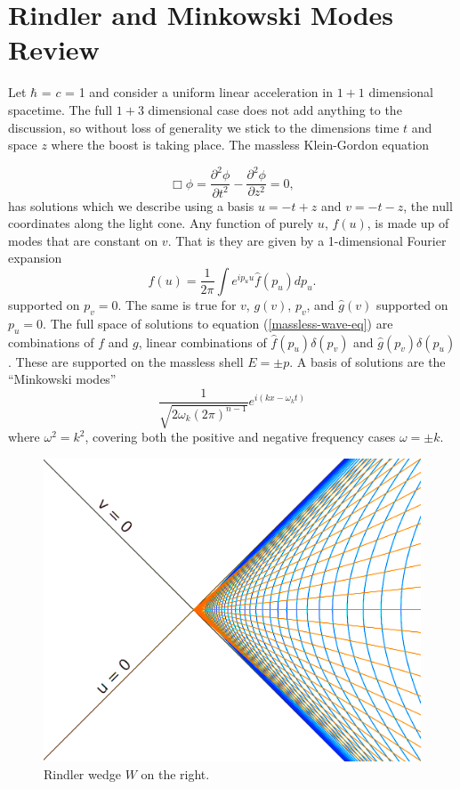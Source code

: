 \documentclass[12pt,a4paper]{article}
\begin{document}
\section{Rindler and Minkowski Modes Review}

Let $\hbar$ = $c$ = 1 and consider a uniform linear acceleration in $1+1$ dimensional spacetime. The full $1+3$ dimensional case does not add anything to the discussion, so without loss of generality we stick to the dimensions time $t$ and space $z$ where the boost is taking place.  The massless Klein-Gordon equation 

\begin{equation}
  \Box \phi = \frac{\partial^2 \phi}{\partial t^2} - \frac{\partial^2 \phi}{\partial z^2} = 0,
 \label{massless-wave-eq}
\end{equation}
has solutions which we describe using a basis  $u = -t + z$ and $v = -t - z$, the null coordinates along the light cone.  Any function of purely $u$, $f(u)$, is made up of modes that are constant on $v$.  That is they are given by a 1-dimensional Fourier expansion
\begin{equation}
  f(u) = \frac{1}{2\pi} \int{e^{i p_u u} \hat{f}(p_u) dp_u}.
\end{equation}
supported on $p_v = 0$.  The same is true for $v$, $g(v)$, $p_v$, and $\hat{g}(v)$ supported on $p_u = 0$.  The full space of solutions to equation (\ref{massless-wave-eq}) are combinations of $f$ and $g$, linear combinations of $\hat{f}(p_u) \delta(p_v)$ and $\hat{g}(p_v) \delta(p_u)$.  These are supported on the massless shell $E = \pm p$.  A basis of solutions are the ``Minkowski modes''
\begin{equation}
  \frac{1}{\sqrt{2\omega_k (2\pi)^{n-1}}} e^{i(k x - \omega_k t)}
\end{equation}
where $\omega^2 = k^2$, covering both the positive and negative frequency cases $\omega = \pm k$.

\begin{figure}[h]
\centering
\includegraphics[scale=0.2]{rindler_w.png}
\caption{Rindler wedge $W$ on the right.}
\label{rindlerw}
\end{figure}
\end{document}
